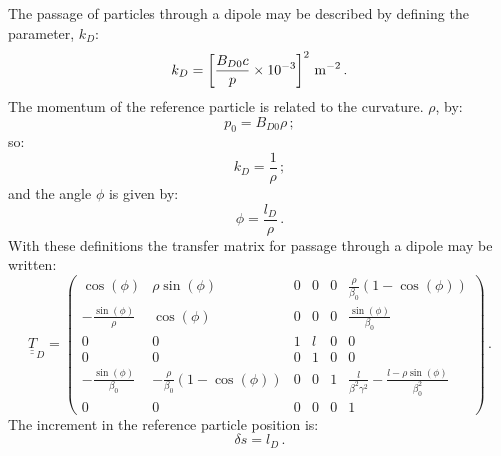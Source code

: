 The passage of particles through a dipole may be described by defining
the parameter, $k_D$:
\begin{equation}
  k_D = \left[ \frac{B_{D0} c}{p} \times 10^{-3} \right]^2\, {\rm m}^{-2} \, .
  \label{Eq:EffectivekD}
\end{equation}
The momentum of the reference particle is related to the
curvature. $\rho$, by:
\begin{equation}
  p_0 = B_{D0} \rho \, ;
\end{equation}
so:
\begin{equation}
  k_D = \frac{1}{\rho} \, ; 
\end{equation}
and the angle $\phi$ is given by:
\begin{equation}
  \phi = \frac{l_D}{\rho} \, .
\end{equation}
With these definitions the transfer matrix for passage through a
dipole may be written:
\begin{equation}
  \underline{\underline{T}}_{D} =
    \begin{pmatrix}
                    \cos(\phi) &                                  \rho \sin(\phi) & 0 & 0 & 0 &                 \frac{\rho}{\beta_0}\left(1 - \cos(\phi) \right) \\
      -\frac{\sin(\phi)}{\rho} &                                       \cos(\phi) & 0 & 0 & 0 &                                       \frac{\sin(\phi)}{\beta_0} \\
                             0 &                                                0 & 1 & l & 0 &                                                                0 \\
                             0 &                                                0 & 0 & 1 & 0 &                                                                0 \\
   -\frac{\sin(\phi)}{\beta_0} &  -\frac{\rho}{\beta_0}\left(1 -\cos(\phi)\right) & 0 & 0 & 1 & \frac{l}{\beta^2 \gamma^2} - \frac{l - \rho\sin(\phi)}{\beta_0^2} \\
                             0 &                                                0 & 0 & 0 & 0 &                                                                1
        \end{pmatrix} \, .
\end{equation}
The increment in the reference particle position is:
\begin{equation}
  \delta s = l_D \, .
\end{equation}
